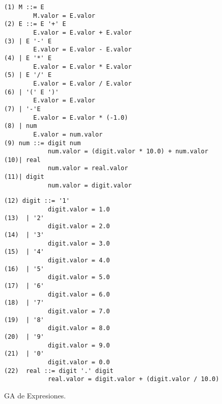 \begin{figure}[h!]
\begin{minipage}{0.47\textwidth}
\begin{center} 
\begin{lstlisting}[columns=fullflexible, backgroundcolor=\color{white}]
(1) M ::= E
        M.valor = E.valor
(2) E ::= E '+' E
        E.valor = E.valor + E.valor 
(3) | E '-' E
        E.valor = E.valor - E.valor 
(4) | E '*' E
        E.valor = E.valor * E.valor 
(5) | E '/' E
        E.valor = E.valor / E.valor 
(6) | '(' E ')'
        E.valor = E.valor 
(7) | '-'E
        E.valor = E.valor * (-1.0)
(8) | num
        E.valor = num.valor
(9) num ::= digit num
            num.valor = (digit.valor * 10.0) + num.valor
(10)| real
            num.valor = real.valor
(11)| digit
            num.valor = digit.valor
\end{lstlisting} 
\end{center}
\end{minipage}
\hspace{0.28cm}\begin{minipage}{0.49\textwidth}
\begin{center}
\begin{lstlisting}[columns=fullflexible, backgroundcolor=\color{white}]
(12) digit ::= '1'
            digit.valor = 1.0
(13)  | '2'
            digit.valor = 2.0
(14)  | '3'
            digit.valor = 3.0
(15)  | '4'
            digit.valor = 4.0
(16)  | '5'
            digit.valor = 5.0
(17)  | '6'
            digit.valor = 6.0
(18)  | '7'
            digit.valor = 7.0
(19)  | '8'
            digit.valor = 8.0
(20)  | '9'
            digit.valor = 9.0
(21)  | '0'
            digit.valor = 0.0
(22)  real ::= digit '.' digit
            real.valor = digit.valor + (digit.valor / 10.0)
\end{lstlisting} 
\end{center}
\end{minipage}
\caption{\label{fig:eje_expresion} GA de Expresiones.}
\end{figure}

